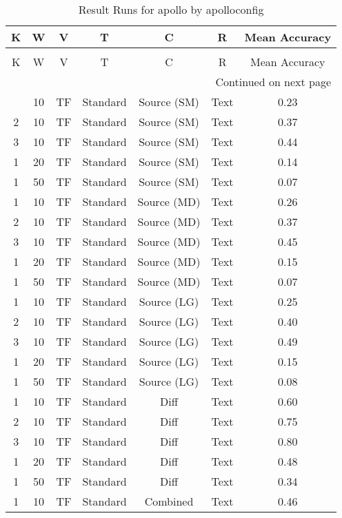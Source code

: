 \begin{longtable}{|c|c|c|c|c|c|c|}
\hline
K & W & V & T & C & R & Mean Accuracy \\
\hline
\endfirsthead
\caption[]{Continued from previous page} \\
\hline
K & W & V & T & C & R & Mean Accuracy \\
\hline
\endhead
\hline
\multicolumn{7}{r}{Continued on next page} \\
\endfoot
\hline
\caption{Result Runs for apollo by apolloconfig} 
\label{result-runs-apollo-apolloconfig}
\endlastfoot
1 & 10 & TF & Standard & Source (SM) & Text & 0.23 \\
\hline
2 & 10 & TF & Standard & Source (SM) & Text & 0.37 \\
\hline
3 & 10 & TF & Standard & Source (SM) & Text & 0.44 \\
\hline
1 & 20 & TF & Standard & Source (SM) & Text & 0.14 \\
\hline
1 & 50 & TF & Standard & Source (SM) & Text & 0.07 \\
\hline
1 & 10 & TF & Standard & Source (MD) & Text & 0.26 \\
\hline
2 & 10 & TF & Standard & Source (MD) & Text & 0.37 \\
\hline
3 & 10 & TF & Standard & Source (MD) & Text & 0.45 \\
\hline
1 & 20 & TF & Standard & Source (MD) & Text & 0.15 \\
\hline
1 & 50 & TF & Standard & Source (MD) & Text & 0.07 \\
\hline
1 & 10 & TF & Standard & Source (LG) & Text & 0.25 \\
\hline
2 & 10 & TF & Standard & Source (LG) & Text & 0.40 \\
\hline
3 & 10 & TF & Standard & Source (LG) & Text & 0.49 \\
\hline
1 & 20 & TF & Standard & Source (LG) & Text & 0.15 \\
\hline
1 & 50 & TF & Standard & Source (LG) & Text & 0.08 \\
\hline
1 & 10 & TF & Standard & Diff & Text & 0.60 \\
\hline
2 & 10 & TF & Standard & Diff & Text & 0.75 \\
\hline
3 & 10 & TF & Standard & Diff & Text & 0.80 \\
\hline
1 & 20 & TF & Standard & Diff & Text & 0.48 \\
\hline
1 & 50 & TF & Standard & Diff & Text & 0.34 \\
\hline
1 & 10 & TF & Standard & Combined & Text & 0.46 \\

\end{longtable}
